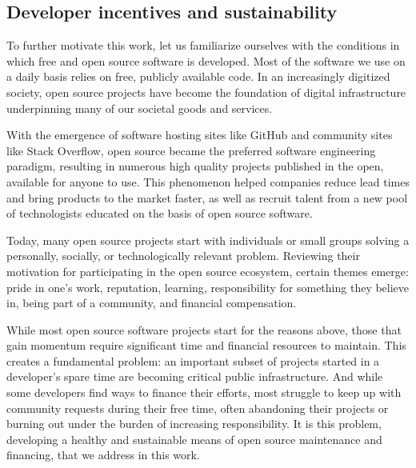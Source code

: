 \subsection{Developer incentives and sustainability}
\label{s:incentives}

To further motivate this work, let us familiarize ourselves with the
conditions in which free and open source software is developed. Most of the
software we use on a daily basis relies on free, publicly available code. In an
increasingly digitized society, open source projects have become the
foundation of digital infrastructure underpinning many of our societal goods
and services.

With the emergence of software hosting sites like GitHub and community sites
like Stack Overflow, open source became the preferred software engineering
paradigm, resulting in numerous high quality projects published in the open,
available for anyone to use. This phenomenon helped
companies reduce lead times and bring products to the market faster, as well as
recruit talent from a new pool of technologists educated on the basis of
open source software.

Today, many open source projects start with individuals or small groups
solving a personally, socially, or technologically relevant problem.
Reviewing their motivation for participating in the open source ecosystem,
certain themes emerge: pride in one's work, reputation, learning,
responsibility for something they believe in, being part of a community, and
financial compensation.

While most open source software projects start for the reasons above, those
that gain momentum require significant time and financial resources to
maintain. This creates a fundamental problem: an important subset of projects
started in a developer's spare time are becoming critical public
infrastructure. And while some developers find ways to finance their efforts,
most struggle to keep up with community requests during their free time, often
abandoning their projects or burning out under the burden of increasing
responsibility. It is this problem, developing a healthy and sustainable means
of open source maintenance and financing, that we address in this work.
